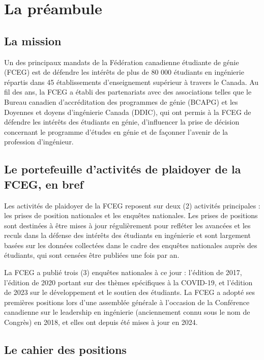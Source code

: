 \section{La préambule}\label{la-preambule}

\subsection{La mission}\label{la-mission}

Un des principaux mandats de la Fédération canadienne étudiante de génie (FCEG) est de défendre les intérêts de plus de 80 000 étudiants en ingénierie répartis dans 45 établissements d'enseignement supérieur à travers le Canada. Au fil des ans, la FCEG a établi des partenariats avec des associations telles que le Bureau canadien d'accréditation des programmes de génie (BCAPG) et les Doyennes et doyens d'ingénierie Canada (DDIC), qui ont permis à la FCEG de défendre les intérêts des étudiants en génie, d'influencer la prise de décision concernant le programme d'études en génie et de façonner l'avenir de la profession d'ingénieur.

\subsection{Le portefeuille d'activités de plaidoyer de la FCEG, en bref}\label{le-portefeuille-dactivites-de-plaidoyer-de-la-fceg-en-bref}

Les activités de plaidoyer de la FCEG reposent sur deux (2) activités principales : les prises de position nationales et les enquêtes nationales. Les prises de positions sont destinées à être mises à jour régulièrement pour refléter les avancées et les reculs dans la défense des intérêts des étudiants en ingénierie et sont largement basées sur les données collectées dans le cadre des enquêtes nationales auprès des étudiants, qui sont censées être publiées une fois par an.

La FCEG a publié trois (3) enquêtes nationales à ce jour : l'édition de 2017, l'édition de 2020 portant sur des thèmes spécifiques à la COVID-19, et l'édition de 2023 sur le développement et le soutien des étudiants. La FCEG a adopté ses premières positions lors d'une assemblée générale à l'occasion de la Conférence canadienne sur le leadership en ingénierie (anciennement connu sous le nom de Congrès) en 2018, et elles ont depuis été mises à jour en 2024.

\subsection{Le cahier des positions}\label{le-cahier-des-positions}

